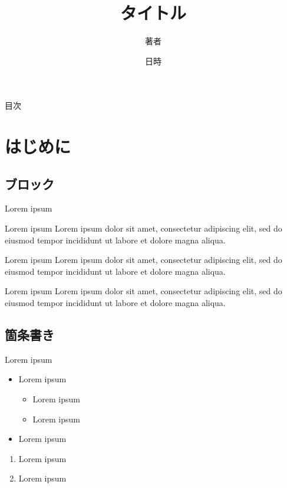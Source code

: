 \documentclass[12pt,unicode]{beamer}
\title{タイトル}
\author{著者}
\date{日時}
\begin{document}
  {\maketitle}


  \begin{frame}{目次}
    \tableofcontents
  \end{frame}

  \section{はじめに}
  \subsection{ブロック}
  \begin{frame}{Lorem ipsum}
    \begin{block}{Lorem ipsum}
      Lorem ipsum dolor sit amet, consectetur adipiscing elit, sed do eiusmod tempor incididunt ut labore et dolore magna aliqua.
    \end{block}

    \begin{alertblock}{Lorem ipsum}
      Lorem ipsum dolor sit amet, consectetur adipiscing elit, sed do eiusmod tempor incididunt ut labore et dolore magna aliqua.
    \end{alertblock}

    \begin{exampleblock}{Lorem ipsum}
      Lorem ipsum dolor sit amet, consectetur adipiscing elit, sed do eiusmod tempor incididunt ut labore et dolore magna aliqua.
    \end{exampleblock}
  \end{frame}

  \subsection{箇条書き}
  \begin{frame}{Lorem ipsum}
    \begin{itemize}
      \item Lorem ipsum
      \begin{itemize}
        \item Lorem ipsum
        \item Lorem ipsum
      \end{itemize}
      \item Lorem ipsum
    \end{itemize}

    \begin{enumerate}
      \item Lorem ipsum
      \item Lorem ipsum
    \end{enumerate}
  \end{frame}
\end{document}
